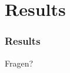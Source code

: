 \section{Results}

\begin{frame}
    \frametitle{Results}

    \begin{center}
        Fragen?
    \end{center}
\end{frame}